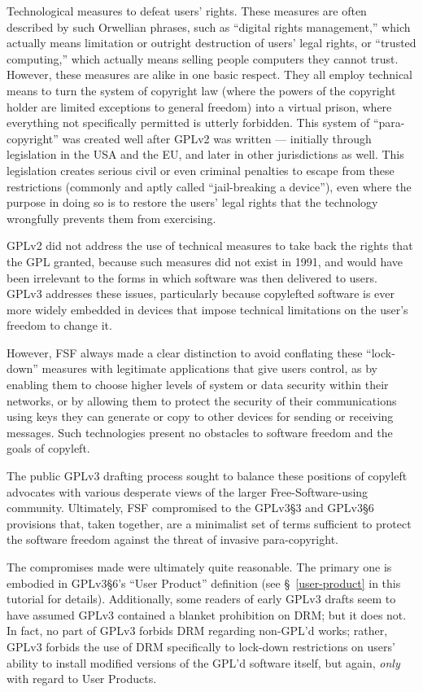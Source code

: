 Technological measures to defeat users' rights.  These measures are often
described by such Orwellian phrases, such as ``digital rights management,''
which actually means limitation or outright destruction of users' legal
rights, or ``trusted computing,'' which actually means selling people
computers they cannot trust.  However, these measures are alike in one basic
respect.  They all employ technical means to turn the system of copyright law
(where the powers of the copyright holder are limited exceptions to general
freedom) into a virtual prison, where everything not specifically permitted
is utterly forbidden.  This system of ``para-copyright'' was created well
after GPLv2 was written --- initially through legislation in the USA and the
EU, and later in other jurisdictions as well.  This legislation creates
serious civil or even criminal penalties to escape from these restrictions
(commonly and aptly called ``jail-breaking a device''), even where the
purpose in doing so is to restore the users' legal rights that the technology
wrongfully prevents them from exercising.

GPLv2 did not address the use of technical measures to take back the rights
that the GPL granted, because such measures did not exist in 1991, and would
have been irrelevant to the forms in which software was then delivered to
users.  GPLv3 addresses these issues, particularly because copylefted
software is ever more widely embedded in devices that impose technical
limitations on the user's freedom to change it.

However, FSF always made a clear distinction to avoid conflating these
``lock-down'' measures with legitimate applications that give users control,
as by enabling them to choose higher levels of system or data security within
their networks, or by allowing them to protect the security of their
communications using keys they can generate or copy to other devices for
sending or receiving messages.  Such technologies present no obstacles to
software freedom and the goals of copyleft.

The public GPLv3 drafting process sought to balance these positions of
copyleft advocates with various desperate views of the larger
Free-Software-using community.  Ultimately, FSF compromised to the GPLv3\S3
and GPLv3\S6 provisions that, taken together, are a minimalist set of terms
sufficient to protect the software freedom against the threat of invasive
para-copyright.

The compromises made were ultimately quite reasonable.  The primary one is
embodied in GPLv3\S6's ``User Product'' definition (see \S~\ref{user-product}
in this tutorial for details).  Additionally, some readers of early GPLv3
drafts seem to have assumed GPLv3 contained a blanket prohibition on DRM; but
it does not.  In fact, no part of GPLv3 forbids DRM regarding non-GPL'd
works; rather, GPLv3 forbids the use of DRM specifically to lock-down
restrictions on users' ability to install modified versions of the GPL'd
software itself, but again, \textit{only} with regard to User Products.

